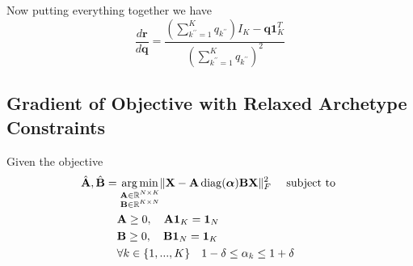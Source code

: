 \documentclass{article}
\DeclareMathOperator*{\argmin}{arg\,min}
\begin{document}
Now putting everything together we have
\begin{equation}
    \frac{d \mathbf{r}}{d \mathbf{q}} =
    \frac{\left( \sum_{k^{\prime \prime}=1}^K {q}_{k^{\prime \prime}}\right) I_K - \mathbf{q} \mathbf{1}_K^T}{\left(\sum_{k^{\prime \prime}=1}^K {q}_{k^{\prime \prime}} \right)^{2}}
\end{equation}

\subsection{Gradient of Objective with Relaxed Archetype Constraints}
\label{subsec:relaxed_objective_grad}

Given the objective
\begin{equation}
\label{eq:relaxed_objective_standard}
    \begin{aligned}
        \hat{\mathbf{A}}, \hat{\mathbf{B}} =& \; \underset{\begin{subarray}{c} \mathbf{A} \in \mathbb{R}^{N \times K} \\
        \mathbf{B} \in \mathbb{R}^{K \times N} \end{subarray}}{\argmin}
        \| {\mathbf{X}} - {\mathbf{A}} \operatorname{diag}(\boldsymbol{\alpha}) \mathbf{B} \mathbf{X}\|_F^2 \quad \text{ subject to } \\
        & \mathbf{A} \geq 0, \quad \mathbf{A} \mathbf{1}_K = \mathbf{1}_N \\
        & \mathbf{B} \geq 0, \quad \mathbf{B} \mathbf{1}_N = \mathbf{1}_K \\
        & \forall k \in \{1, ..., K\} \quad 1 - \delta \leq \alpha_k \leq 1 + \delta
    \end{aligned}
\end{equation}
\end{document}
